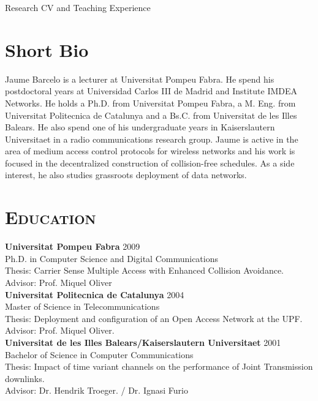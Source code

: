 \documentclass[line,margin]{res}
\begin{document}
 




%

 

\newpage
\begin{resume}
{\large Research CV and Teaching Experience}

\section{Short Bio}
      Jaume Barcelo is a lecturer at Universitat Pompeu Fabra. He spend his postdoctoral years at Universidad Carlos III de Madrid and Institute IMDEA Networks. He holds a Ph.D. from Universitat Pompeu Fabra, a M. Eng. from Universitat Politecnica de Catalunya and a Bs.C. from Universitat de les Illes Balears. He also spend one of his undergraduate years in Kaiserslautern Universitaet in a radio communications research group. Jaume is active in the area of medium access control protocols for wireless networks and his work is focused in the decentralized construction of collision-free schedules. As a side interest, he also studies grassroots deployment of data networks.

\section{\textsc{Education}} 
\textbf{Universitat Pompeu Fabra} \hfill 2009 \\
Ph.D. in Computer Science and Digital Communications \\
 Thesis: Carrier Sense Multiple Access with Enhanced Collision Avoidance. \\
 Advisor: Prof. Miquel Oliver\\
\textbf{Universitat Politecnica de Catalunya} \hfill 2004 \\ 
Master of Science in Telecommunications \\
 Thesis: Deployment and configuration of an Open Access Network at the UPF. \\
 Advisor: Prof. Miquel Oliver.\\
\textbf{Universitat de les Illes Balears/Kaiserslautern Universitaet} \hfill 2001 \\ 
Bachelor of Science in Computer Communications \\
Thesis: Impact of time variant channels on the performance of Joint Transmission downlinks.\\
Advisor: Dr. Hendrik Troeger. / Dr. Ignasi Furio \\


\end{resume}
\end{document}
